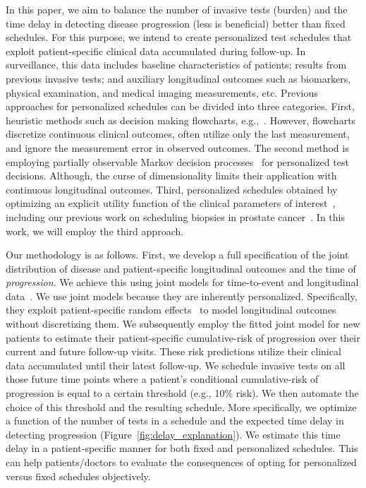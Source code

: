 In this paper, we aim to balance the number of invasive tests (burden) and the time delay in detecting disease progression (less is beneficial) better than fixed schedules. For this purpose, we intend to create personalized test schedules that exploit patient-specific clinical data accumulated during follow-up. In surveillance, this data includes baseline characteristics of patients; results from previous invasive tests; and auxiliary longitudinal outcomes such as biomarkers, physical examination, and medical imaging measurements, etc. Previous approaches for personalized schedules can be divided into three categories. First, heuristic methods such as decision making flowcharts, e.g.,~\citet{bokhorst2015compliance}. However, flowcharts discretize continuous clinical outcomes, often utilize only the last measurement, and ignore the measurement error in observed outcomes. The second method is employing partially observable Markov decision processes~\citep{alagoz2010operations, steimle2017markov} for personalized test decisions. Although, the curse of dimensionality limits their application with continuous longitudinal outcomes. Third, personalized schedules obtained by optimizing an explicit utility function of the clinical parameters of interest~\citep{bebu2017optimal,rizopoulos2015personalized}, including our previous work on scheduling biopsies in prostate cancer~\citep{tomer2019personalized}. In this work, we will employ the third approach.

Our methodology is as follows. First, we develop a full specification of the joint distribution of disease and patient-specific longitudinal outcomes and the time of \textit{progression}. We achieve this using joint models for time-to-event and longitudinal data~\citep{tsiatis2004joint,rizopoulos2012joint}. We use joint models because they are inherently personalized. Specifically, they exploit patient-specific random effects~\citep{laird1982random} to model longitudinal outcomes without discretizing them. We subsequently employ the fitted joint model for new patients to estimate their patient-specific cumulative-risk of progression over their current and future follow-up visits. These risk predictions utilize their clinical data accumulated until their latest follow-up. We schedule invasive tests on all those future time points where a patient's conditional cumulative-risk of progression is equal to a certain threshold (e.g., 10\% risk). We then automate the choice of this threshold and the resulting schedule. More specifically, we optimize a function of the number of tests in a schedule and the expected time delay in detecting progression (Figure~\ref{fig:delay_explanation}). We estimate this time delay in a patient-specific manner for both fixed and personalized schedules. This can help patients/doctors to evaluate the consequences of opting for personalized versus fixed schedules objectively.

